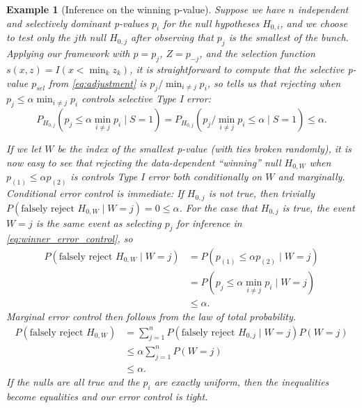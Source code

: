 \documentclass{article}
\newtheorem{example}{Example}
\begin{document}
\begin{example}[Inference on the winning p-value]
    \label{exm:winner} Suppose we have $n$ independent and selectively dominant p-values $p_i$ for the null hypotheses $H_{0, i}$, and we choose to test only the $j$th null $H_{0, j}$ after observing that $p_j$ is the smallest of the bunch. Applying our framework with $p =p_j$, $Z = p_{-j}$, and the selection function $s(x, z) = I(x < \min_{k} z_k)$, it is straightforward to compute that the selective p-value $p_{sel}$ from \eqref{eq:adjustment} is $p_j/\min_{i \neq j} p_i$, so  tells us that rejecting when $p_j \leq \alpha \min_{i \neq j} p_i$ controls selective Type I error:
    \begin{equation}
        \label{eq:winner_error_control}
        P_{H_{0, j}}(p_j \leq \alpha \min_{i \neq j} p_i \mid S = 1) = P_{H_{0, j}}(p_j/\min_{i \neq j} p_i \leq \alpha  \mid S = 1) \leq \alpha.
    \end{equation} 

    If we let $W$ be the index of the smallest p-value (with ties broken randomly), it is now easy to see that rejecting the data-dependent ``winning'' null $H_{0, W}$ when $p_{(1)} \leq \alpha p_{(2)}$ is controls Type I error both conditionally on $W$ and marginally. Conditional error control is immediate: If $H_{0, j}$ is not true, then trivially $P(\text{falsely reject } H_{0, W} \mid W = j) = 0 \leq \alpha$. For the case that $H_{0, j}$ is true, the event $W=j$ is the same event as selecting $p_j$ for inference in \eqref{eq:winner_error_control}, so 
    \begin{align*}
        P(\text{falsely reject } H_{0, W} \mid W = j) &= P(p_{(1)} \leq \alpha p_{(2)} \mid W = j)\\
        &= P(p_j \leq \alpha \min_{i \neq j} p_i \mid W = j)\\
        &\leq \alpha.
    \end{align*}
    Marginal error control then follows from the law of total probability. 
    \begin{align*}
        P(\text{falsely reject } H_{0, W}) &= \sum_{j=1}^n P(\text{falsely reject } H_{0, j} \mid W = j)P(W=j) \\
                                          &\leq \alpha \sum_{j=1}^n P(W=j)\\
                                          &\leq \alpha. 
    \end{align*}
    If the nulls are all true and the $p_i$ are exactly uniform, then the inequalities become equalities and our error control is tight. 
\end{example}
\end{document}
